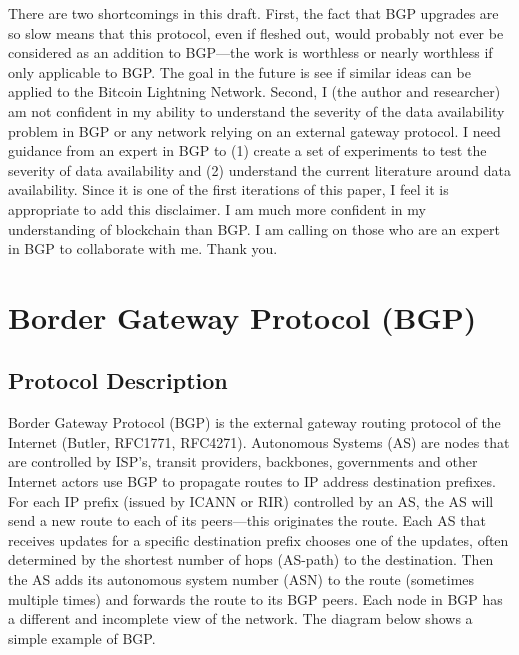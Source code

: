 \documentclass[letterpaper, 10 pt, conference]{ieeeconf}  %
\begin{document}
There are two shortcomings in this draft. First, the fact that BGP upgrades are so slow means that this protocol, even if fleshed out, would probably not ever be considered as an addition to BGP---the work is worthless or nearly worthless if only applicable to BGP. The goal in the future is see if similar ideas can be applied to the Bitcoin Lightning Network. Second, I (the author and researcher) am not confident in my ability to understand the severity of the data availability problem in BGP or any network relying on an external gateway protocol. I need guidance from an expert in BGP to (1) create a set of experiments to test the severity of data availability and (2) understand the current literature around data availability. Since it is one of the first iterations of this paper, I feel it is appropriate to add this disclaimer. I am much more confident in my understanding of blockchain than BGP. I am calling on those who are an expert in BGP to collaborate with me. Thank you.  


\section{Border Gateway Protocol (BGP)}

\subsection{Protocol Description}

Border Gateway Protocol (BGP) is the external gateway routing protocol of the Internet (Butler, RFC1771, RFC4271). Autonomous Systems (AS) are nodes that are controlled by ISP’s, transit providers, backbones, governments and other Internet actors use BGP to propagate routes to IP address destination prefixes. For each IP prefix (issued by ICANN or RIR) controlled by an AS, the AS will send a new route to each of its peers---this originates the route. Each AS that receives updates for a specific destination prefix chooses one of the updates, often determined by the shortest number of hops (AS-path) to the destination. Then the AS adds its autonomous system number (ASN) to the route (sometimes multiple times) and forwards the route to its BGP peers. Each node in BGP has a different and incomplete view of the network. The diagram below shows a simple example of BGP.
\end{document}
